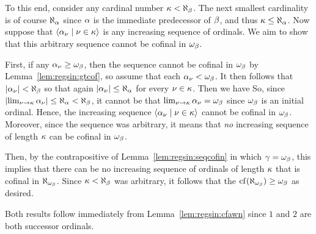 {{        To this end, consider any cardinal number $\kappa < \aleph_\beta$.
        The next smallest cardinality is of course $\aleph_\alpha$ since $\alpha$ is the immediate predecessor of $\beta$, and thus $\kappa \leq \aleph_\alpha$.
        Now suppose that $\left\langle \alpha_\nu \mid \nu \in \kappa \right\rangle$ is any increasing sequence of ordinals.
        We aim to show that this arbitrary sequence cannot be cofinal in $\omega_\beta$.

        First, if any $\alpha_\nu \geq \omega_\beta$, then the sequence cannot be cofinal in $\omega_\beta$ by Lemma~\ref{lem:regsin:gtcof}, so assume that each $\alpha_\nu < \omega_\beta$.
        It then follows that $\left| \alpha_\nu \right| < \aleph_\beta$ so that again $\left| \alpha_\nu \right| \leq \aleph_\alpha$ for every $\nu \in \kappa$.
        Then we have
        So, since $\left| \lim_{\nu \to \kappa} \alpha_\nu \right| \leq \aleph_\alpha < \aleph_\beta$, it cannot be that $\lim_{\nu \to \kappa} \alpha_\nu = \omega_\beta$ since $\omega_\beta$ is an initial ordinal.
        Hence, the increasing sequence $\left\langle \alpha_\nu \mid \nu \in \kappa \right\rangle$ cannot be cofinal in $\omega_\beta$.
        Moreover, since the sequence was arbitrary, it means that \emph{no} increasing sequence of length $\kappa$ can be cofinal in $\omega_\beta$.

        Then, by the contrapositive of Lemma~\ref{lem:regsin:seqcofin} in which $\gamma = \omega_\beta$, this implies that there can be no increasing sequence of ordinals of length $\kappa$ that is cofinal in $\aleph_{\omega_\beta}$.
        Since $\kappa < \aleph_\beta$ was arbitrary, it follows that the $\mathrm{cf}(\aleph_{\omega_\beta}) \geq \omega_\beta$ as desired.
    }

    \mainprob

    Both results follow immediately from Lemma~\ref{lem:regsin:cfawn} since $1$ and $2$ are both successor ordinals.
}





